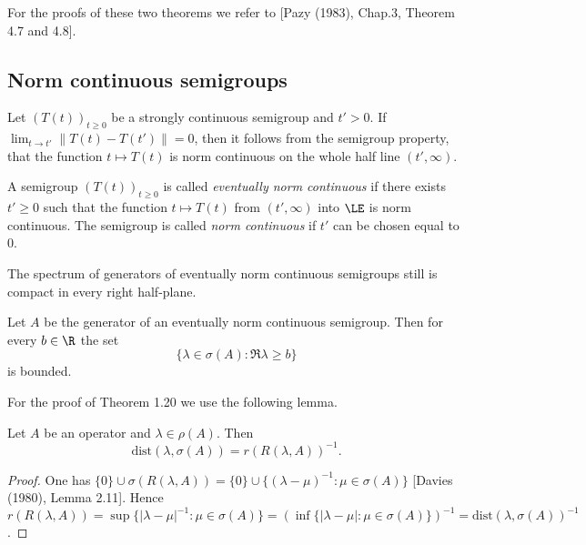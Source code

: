 For the proofs of these two theorems we refer to [Pazy (1983), Chap.3, Theorem 4.7 and 4.8].

\subsection{Norm continuous semigroups} \label{subsec:a2-1.se6}

Let $(T(t))_{t\geq 0}$ be a strongly continuous semigroup and $t' > 0$.
If $\lim_{t \to t'} \|T(t) - T(t')\| = 0$, then it follows from the semigroup property, that the function $t \mapsto T(t)$ is norm continuous on the whole half line $(t',\infty)$.

\begin{definition}\label{def:a2-1.19}
A semigroup $(T(t))_{t\geq 0}$ is called \emph{eventually norm continuous} if there exists $t' \geq 0$ such that the function $t \mapsto T(t)$ from $(t',\infty)$ into $\LE$ is norm continuous.
The semigroup is called \emph{norm continuous} if $t'$ can be chosen equal to $0$.
\end{definition}

The spectrum of generators of eventually norm continuous semigroups still is compact in every right half-plane.

\begin{theorem}\label{thm:a2-1.20}
Let $A$ be the generator of an eventually norm continuous semigroup.
Then for every $b \in \R$ the set
\[
    \{\lambda \in \sigma(A) \colon \Re\lambda \geq b\}
\]
is bounded.
\end{theorem}
For the proof of Theorem 1.20 we use the following lemma.

\begin{lemma}\label{lem:a2-1.21}
Let $A$ be an operator and $\lambda \in \rho(A)$.
Then
\[
    \text{dist}(\lambda,\sigma(A)) = r(R(\lambda,A))^{-1}.
\]
\end{lemma}

\begin{proof}
One has $\{0\} \cup \sigma(R(\lambda,A)) = \{0\} \cup \{(\lambda-\mu)^{-1} \colon \mu \in \sigma(A)\}$ [Davies (1980), Lemma 2.11].
Hence $r(R(\lambda,A)) = \sup \{|\lambda-\mu|^{-1} \colon \mu \in \sigma(A)\} = 
(\inf \{|\lambda-\mu| \colon \mu \in \sigma(A)\})^{-1} = \text{dist}(\lambda,\sigma(A))^{-1}$.
\end{proof}

